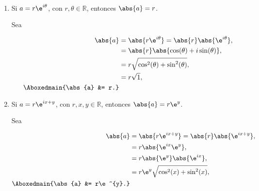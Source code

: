 \documentclass[./../main.tex]{subfiles}
\begin{document}
\begin{enumerate}
        \item Si \(a = r\e^{i\theta}\), con \(r, \theta \in \mathbb{R}\), entonces \(\abs{a} = r\).
        
        \startsolution

        Sea 

        \begin{align*}
            \abs{a} &= \abs{r\e^{i\theta}} = \abs{r}\abs{\e^{i\theta}},\\
            &= \abs{r}\abs{\cos(\theta) + i\sin(\theta)},\\
            &= r\sqrt{\cos^{2}(\theta) + \sin^{2}(\theta)},\\
            &= r\sqrt{1},\\
            \Aboxedmain{\abs{a} &= r.}
        \end{align*}
        
        \item Si \(a = r\e^{ix + y}\), con \(r, x, y \in \mathbb{R}\), entonces \(\abs{a} = r\e^{y}\).

        \startsolution

        Sea

        \begin{align*}
            \abs{a} &= \abs{r\e^{ix + y}} = \abs{r}\abs{\e^{ix + y}},\\
            &= r\abs{\e^{ix}\e^{y}},\\
            &= r\abs{\e^{y}}\abs{\e^{ix}},\\
            &= r\e^{y}\sqrt{\cos^{2}(x) + \sin^{2}(x)},\\
            \Aboxedmain{\abs{a} &= r\e^{y}.}
        \end{align*}
    \end{enumerate}
\end{document}
